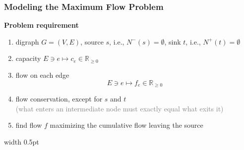 \documentclass[a4paper, 11pt]{report}
\begin{document}
\subsubsection{Modeling the Maximum Flow Problem}
\noindent
\begin{minipage}[t]{0.45\textwidth}
    \raggedright
    \textbf{Problem requirement}\\[2mm]
    \begin{enumerate}
        \item digraph $G = (V, E)$, source $s$, i.e., $N^-(s) = \emptyset$, sink $t$, i.e., $N^+(t) = \emptyset$ 
        \vspace{4.5em}
        
        \item capacity $E \ni e \mapsto c_e \in \mathbb{R}_{\ge 0}$ 
        \vspace{2.5em}
        
        \item flow on each edge
            $$E \ni e \mapsto f_e \in \mathbb{R}_{\ge 0}$$
        \vspace{3.5em}
        
        \item flow conservation, except for $s$ and $t$ \\
        \textcolor{gray}{\small (what enters an intermediate node must exactly equal what exits it)}
        
        \vspace{10.5em}
        
        \item find flow $f$ maximizing the cumulative flow leaving the source
    \end{enumerate}
\end{minipage}%
\hfill
\vrule width 0.5pt
\hfill
\end{document}
